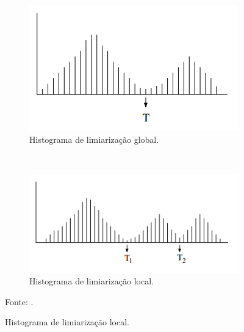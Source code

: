 \begin{figure}[H]
   \caption{Histogramas de limiarizações.}
   \centering
   \label{segment:fig:2}
    \begin{subfigure}[t]{0.45\textwidth}
        \centering
        \includegraphics[width=1\linewidth]{recursos/imagens/image_seg/limi_glob.png}
        \caption{Histograma de limiarização global.}
        \label{segment:fig:2.1}
    \end{subfigure}%
    ~ 
    \begin{subfigure}[t]{0.45\textwidth}
        \centering
        \includegraphics[width=1\linewidth]{recursos/imagens/image_seg/limi_local.png}
        \caption{Histograma de limiarização local.}
        \label{segment:fig:2.2}
    \end{subfigure}%

    Fonte: \cite{pedrini2008analise}.
\end{figure}

